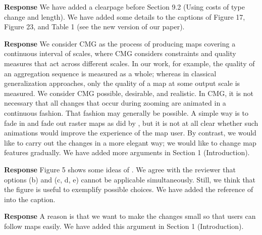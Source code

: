 \documentclass[a4paper,twoside,11pt]{reviewresponse}
\begin{document}
\textbf{Response} We have added a clearpage before 
Section 9.2 (Using costs of type change and length).
We have added some details to the captions of 
Figure 17, Figure 23, and Table 1 (see the new version of our paper).





\textbf{Response} 
We consider CMG as the process of producing maps 
covering a continuous interval of scales,
where CMG considers constraints and quality measures 
that act across different scales. 
In our work, for example, the quality of an aggregation sequence 
is measured as a whole; 
whereas in classical generalization approaches, 
only the quality of a map at some output scale is measured.
We consider CMG possible, desirable, and realistic.
In CMG, it is not necessary that 
all changes that occur during zooming are animated in a continuous fashion. 
That fashion may generally be possible. 
A simple way is to fade in and fade out raster maps
as did by \textcite{Pantazis2009b}, 
but it is not at all clear 
whether such animations would improve the experience of the map user.
By contrast, we would like to carry out the changes in a more elegant way;
we would like to change map features gradually.
We have added more arguments in Section 1 (Introduction).



\textbf{Response} Figure 5 shows some ideas of \textcite{Cheng2006}.
We agree with the reviewer that
options (b) and (c, d, e) cannot be applicable simultaneously.
Still, we think that the figure is useful to exemplify possible choices.
We have added the reference of \textcite{Cheng2006} into the caption.



\textbf{Response}
A reason is that we want to make the changes small 
so that users can follow maps easily.
We have added this argument in Section 1 (Introduction).
\end{document}
